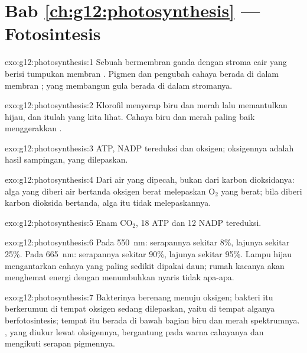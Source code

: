 \section*{Bab \ref{ch:g12:photosynthesis} --- Fotosintesis}

\begin{solution}{exo:g12:photosynthesis:1}
Sebuah  bermembran ganda dengan stroma cair yang berisi
tumpukan membran . Pigmen dan  pengubah cahaya berada di
dalam membran ;  yang membangun gula berada di dalam
stromanya.
\end{solution}

\begin{solution}{exo:g12:photosynthesis:2}
Klorofil menyerap biru dan merah lalu memantulkan hijau, dan itulah
yang kita lihat. Cahaya biru dan merah paling baik menggerakkan
.
\end{solution}

\begin{solution}{exo:g12:photosynthesis:3}
ATP, NADP tereduksi dan oksigen; oksigennya adalah hasil sampingan,
yang dilepaskan.
\end{solution}

\begin{solution}{exo:g12:photosynthesis:4}
Dari air yang dipecah, bukan dari karbon dioksidanya: alga yang diberi
air bertanda oksigen berat melepaskan $\mathrm{O_2}$ yang berat; bila
diberi karbon dioksida bertanda, alga itu tidak melepaskannya.
\end{solution}

\begin{solution}{exo:g12:photosynthesis:5}
Enam $\mathrm{CO_2}$, 18 ATP dan 12 NADP tereduksi.
\end{solution}

\begin{solution}{exo:g12:photosynthesis:6}
Pada \qty{550}{nm}: serapannya sekitar 8\%, lajunya sekitar 25\%. Pada
\qty{665}{nm}: serapannya sekitar 90\%, lajunya sekitar 95\%. Lampu
hijau mengantarkan cahaya yang paling sedikit dipakai daun; rumah
kacanya akan menghemat energi dengan menumbuhkan nyaris tidak apa-apa.
\end{solution}

\begin{solution}{exo:g12:photosynthesis:7}
Bakterinya berenang menuju oksigen; bakteri itu berkerumun di tempat
oksigen sedang dilepaskan, yaitu di tempat alganya berfotosintesis;
tempat itu berada di bawah bagian biru dan merah spektrumnya.
, yang diukur lewat oksigennya, bergantung pada warna
cahayanya dan mengikuti serapan pigmennya.
\end{solution}

